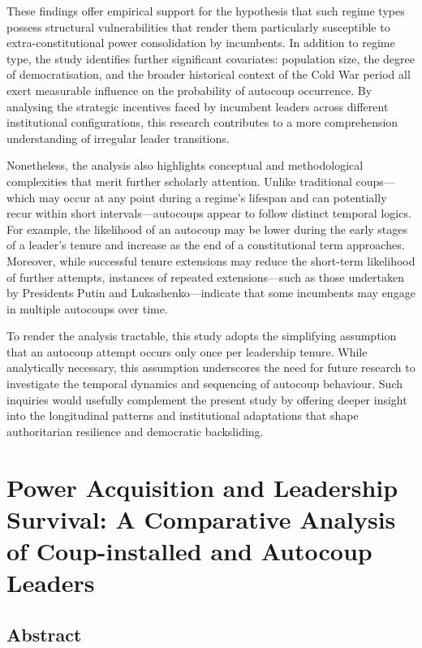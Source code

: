 \documentclass[
  12pt,
]{report}
\begin{document}
These findings offer empirical support for the hypothesis that such
regime types possess structural vulnerabilities that render them
particularly susceptible to extra-constitutional power consolidation by
incumbents. In addition to regime type, the study identifies further
significant covariates: population size, the degree of democratisation,
and the broader historical context of the Cold War period all exert
measurable influence on the probability of autocoup occurrence. By
analysing the strategic incentives faced by incumbent leaders across
different institutional configurations, this research contributes to a
more comprehension understanding of irregular leader transitions.

Nonetheless, the analysis also highlights conceptual and methodological
complexities that merit further scholarly attention. Unlike traditional
coups---which may occur at any point during a regime's lifespan and can
potentially recur within short intervals---autocoups appear to follow
distinct temporal logics. For example, the likelihood of an autocoup may
be lower during the early stages of a leader's tenure and increase as
the end of a constitutional term approaches. Moreover, while successful
tenure extensions may reduce the short-term likelihood of further
attempts, instances of repeated extensions---such as those undertaken by
Presidents Putin and Lukashenko---indicate that some incumbents may
engage in multiple autocoups over time.

To render the analysis tractable, this study adopts the simplifying
assumption that an autocoup attempt occurs only once per leadership
tenure. While analytically necessary, this assumption underscores the
need for future research to investigate the temporal dynamics and
sequencing of autocoup behaviour. Such inquiries would usefully
complement the present study by offering deeper insight into the
longitudinal patterns and institutional adaptations that shape
authoritarian resilience and democratic backsliding.

\chapter{Power Acquisition and Leadership Survival: A Comparative
Analysis of Coup-installed and Autocoup
Leaders}\label{power-acquisition-and-leadership-survival-a-comparative-analysis-of-coup-installed-and-autocoup-leaders}

\section*{Abstract}\label{abstract-3}
\end{document}
